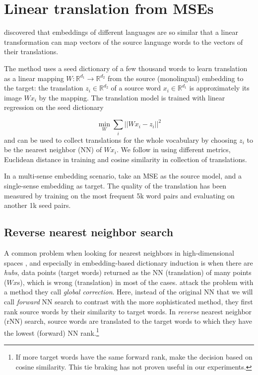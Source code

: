 \documentclass[11pt]{article}
\newcommand{\Ro}{\mathbb{R}^{d_1}}
\newcommand{\Rt}{\mathbb{R}^{d_2}}
\begin{document}
\section{Linear translation from MSEs}
\label{sec:linTrans}

 \cite{Mikolov:2013x} discovered that embeddings of different languages are so
 similar that a linear transformation can map vectors of the source language
 words to the vectors of their translations.

The method uses a seed dictionary of a few thousand words to learn translation
as a linear mapping $W: \mathbb{R}^{d_1}\rightarrow \mathbb{R}^{d_2}$ from the
source (monolingual) embedding to the target: the translation $z_i \in \Rt$ of
a source word $x_i \in \Ro$ is approximately its image $Wx_i$ by the mapping.
The translation model is trained with linear regression on the seed dictionary

\[\min_W \sum_i || Wx_i - z_i ||^2 \]
and can be used to collect translations for the whole vocabulary by choosing
$z_i$ to be the nearest neighbor (NN) of $Wx_i$.  We follow
\cite{Mikolov:2013x} in using different metrics, Euclidean distance in training
and cosine similarity in collection of translations.

In a multi-sense embedding scenario, \cite{Borbely:2016} take an MSE as the
source model, and a single-sense embedding as target.  The quality of the
translation has been measured by training on the most frequent 5k word pairs
and evaluating on another 1k seed pairs.

\subsection{Reverse nearest neighbor search}


A common problem when looking for nearest neighbors in high-dimensional spaces
\citep{Radovanovic:2010,Suzuki:2013,Tomasev:2013}, and especially in
embedding-based dictionary induction \citep{Dinu:2015,Lazaridou:2015} is when
there are \emph{hubs}, data points (target words) returned as the NN
(translation) of many points ($Wx$s), which is wrong (translation) in most of
the cases.  \cite{Dinu:2015} attack the problem with a method they call
\emph{global correction}.  Here, instead of the original NN that we will call
\emph{forward} NN search to contrast with the more sophisticated method, they
first rank source words by their similarity to target words. In \emph{reverse}
nearest neighbor (rNN) search, source words are translated to the target words
to which they have the lowest (forward) NN rank.\footnote{If more target words
have the same forward rank, \cite{Dinu:2015} make the decision based on cosine
similarity. This tie braking has not proven useful in our experiments.}
\end{document}
